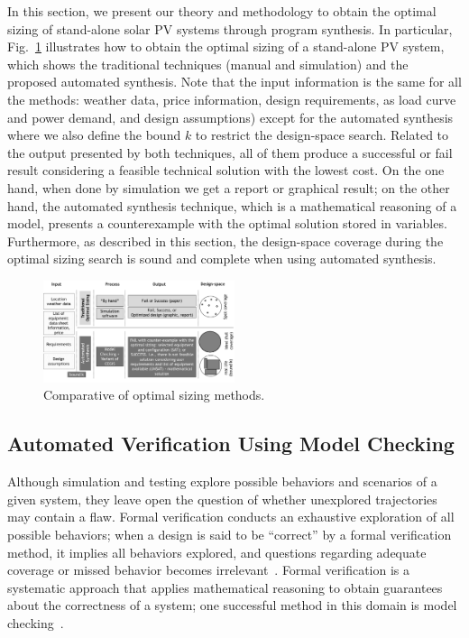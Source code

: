 \documentclass[journal]{IEEEtran}
\begin{document}
In this section, we present our theory and methodology to obtain the optimal sizing of stand-alone solar PV systems through program synthesis. In particular, Fig.~\ref{fig:optimization} illustrates how to obtain the optimal sizing of a stand-alone PV system, which shows the traditional techniques (manual and simulation) and the proposed automated synthesis. Note that the input information is the same for all the methods: weather data, price information, design requirements, as load curve and power demand, and design assumptions) except for the automated synthesis where we also define the bound $k$ to restrict the design-space search. Related to the output presented by both techniques, all of them produce a successful or fail result considering a feasible technical solution with the lowest cost. On the one hand, when done by simulation we get a report or graphical result; on the other hand, the automated synthesis technique, which is a mathematical reasoning of a model, presents a counterexample with the optimal solution stored in variables. Furthermore, as described in this section, the design-space coverage during the optimal sizing search is sound and complete when using automated synthesis.
%
\begin{figure}[h]
\includegraphics[width=0.5\textwidth]{optimalsizingprocess3}
\centering
\caption{Comparative of optimal sizing methods.}
\label{fig:optimization}
\end{figure}

\subsection{Automated Verification Using Model Checking}
\label{sec:AutomatedVerification}

Although simulation and testing explore possible behaviors and scenarios of a given system, they leave open the question of whether unexplored trajectories may contain a flaw. Formal verification conducts an exhaustive exploration of all possible behaviors; when a design is said to be ``correct'' by a formal verification method, it implies all behaviors explored, and questions regarding adequate coverage or missed behavior becomes irrelevant~\cite{Clarke2012}. Formal verification is a systematic approach that applies mathematical reasoning to obtain guarantees about the correctness of a system; one successful method in this domain is model checking~\cite{Clarke2012}. 
\end{document}
